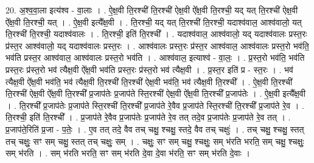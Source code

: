 \documentclass[17pt]{extarticle}
\begin{document}
20. अ॒श्व॒वा॒ला इत्य॑श्व - वा॒लाः । . ऐ॒क्ष॒वी ति॒रश्ची॑ ति॒रश्ची॑ ऐक्ष॒वी ऐ᳚क्ष॒वी ति॒रश्ची॒ यद् यत् ति॒रश्ची॑ ऐक्ष॒वी ऐ᳚क्ष॒वी ति॒रश्ची॒ यत् । . ऐ॒क्ष॒वी इत्यै᳚क्ष॒वी । . ति॒रश्ची॒ यद् यत् ति॒रश्ची॑ ति॒रश्ची॒ यदाश्व॑वाल॒ आश्व॑वालो॒ यत् ति॒रश्ची॑ ति॒रश्ची॒ यदाश्व॑वालः । . ति॒रश्ची॒ इति॑ ति॒रश्ची᳚ । . यदाश्व॑वाल॒ आश्व॑वालो॒ यद् यदाश्व॑वालः प्रस्त॒रः प्र॑स्त॒र आश्व॑वालो॒ यद् यदाश्व॑वालः प्रस्त॒रः । . आश्व॑वालः प्रस्त॒रः प्र॑स्त॒र आश्व॑वाल॒ आश्व॑वालः प्रस्त॒रो भव॑ति॒ भव॑ति प्रस्त॒र आश्व॑वाल॒ आश्व॑वालः प्रस्त॒रो भव॑ति । . आश्व॑वाल॒ इत्याश्व॑ - वा॒लः॒ । . प्र॒स्त॒रो भव॑ति॒ भव॑ति प्रस्त॒रः प्र॑स्त॒रो भव॑ त्यैक्ष॒वी ऐ᳚क्ष॒वी भव॑ति प्रस्त॒रः प्र॑स्त॒रो भव॑ त्यैक्ष॒वी । . प्र॒स्त॒र इति॑ प्र - स्त॒रः । . भव॑ त्यैक्ष॒वी ऐ᳚क्ष॒वी भव॑ति॒ भव॑ त्यैक्ष॒वी ति॒रश्ची॑ ति॒रश्ची॑ ऐक्ष॒वी भव॑ति॒ भव॑ त्यैक्ष॒वी ति॒रश्ची᳚ । . ऐ॒क्ष॒वी ति॒रश्ची॑ ति॒रश्ची॑ ऐक्ष॒वी ऐ᳚क्ष॒वी ति॒रश्ची᳚ प्र॒जाप॑तेः प्र॒जाप॑ते स्ति॒रश्ची॑ ऐक्ष॒वी ऐ᳚क्ष॒वी ति॒रश्ची᳚ प्र॒जाप॑तेः । . ऐ॒क्ष॒वी इत्यै᳚क्ष॒वी । . ति॒रश्ची᳚ प्र॒जाप॑तेः प्र॒जाप॑ते स्ति॒रश्ची॑ ति॒रश्ची᳚ प्र॒जाप॑ते रे॒वैव प्र॒जाप॑ते स्ति॒रश्ची॑ ति॒रश्ची᳚ प्र॒जाप॑ते रे॒व । . ति॒रश्ची॒ इति॑ ति॒रश्ची᳚ । . प्र॒जाप॑ते रे॒वैव प्र॒जाप॑तेः प्र॒जाप॑ते रे॒व तत् तदे॒व प्र॒जाप॑तेः प्र॒जाप॑ते रे॒व तत् । . प्र॒जाप॑ते॒रिति॑ प्र॒जा - प॒तेः॒ । . ए॒व तत् तदे॒ वैव तच् चक्षु॒ श्चक्षु॒ स्तदे॒ वैव तच् चक्षुः॑ । . तच् चक्षु॒ श्चक्षु॒ स्तत् तच् चक्षुः॒ सꣳ सम् चक्षु॒ स्तत् तच् चक्षुः॒ सम् । . चक्षुः॒ सꣳ सम् चक्षु॒ श्चक्षुः॒ सम् भ॑रति भरति॒ सम् चक्षु॒ श्चक्षुः॒ सम् भ॑रति । . सम् भ॑रति भरति॒ सꣳ सम् भ॑रति दे॒वा दे॒वा भ॑रति॒ सꣳ सम् भ॑रति दे॒वाः । \newline
\end{document}
